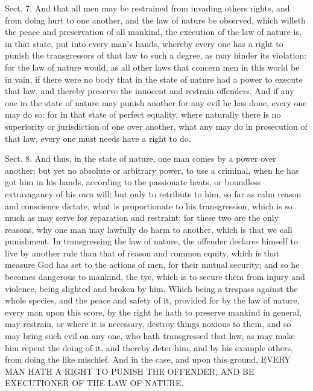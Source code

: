 \documentclass[11pt,openany]{book}
\begin{document}
Sect. 7. And that all men may be restrained from invading others rights, and from doing hurt to one another, and the law of nature be observed, which willeth the peace and preservation of all mankind, the execution of the law of nature is, in that state, put into every man's hands, whereby every one has a right to punish the transgressors of that law to such a degree, as may hinder its violation: for the law of nature would, as all other laws that concern men in this world be in vain, if there were no body that in the state of nature had a power to execute that law, and thereby preserve the innocent and restrain offenders. And if any one in the state of nature may punish another for any evil he has done, every one may do so: for in that state of perfect equality, where naturally there is no superiority or jurisdiction of one over another, what any may do in prosecution of that law, every one must needs have a right to do.

Sect. 8. And thus, in the state of nature, one man comes by a power over another; but yet no absolute or arbitrary power, to use a criminal, when he has got him in his hands, according to the passionate heats, or boundless extravagancy of his own will; but only to retribute to him, so far as calm reason and conscience dictate, what is proportionate to his transgression, which is so much as may serve for reparation and restraint: for these two are the only reasons, why one man may lawfully do harm to another, which is that we call punishment. In transgressing the law of nature, the offender declares himself to live by another rule than that of reason and common equity, which is that measure God has set to the actions of men, for their mutual security; and so he becomes dangerous to mankind, the tye, which is to secure them from injury and violence, being slighted and broken by him. Which being a trespass against the whole species, and the peace and safety of it, provided for by the law of nature, every man upon this score, by the right he hath to preserve mankind in general, may restrain, or where it is necessary, destroy things noxious to them, and so may bring such evil on any one, who hath transgressed that law, as may make him repent the doing of it, and thereby deter him, and by his example others, from doing the like mischief. And in the case, and upon this ground, EVERY MAN HATH A RIGHT TO PUNISH THE OFFENDER, AND BE EXECUTIONER OF THE LAW OF NATURE.
\end{document}
